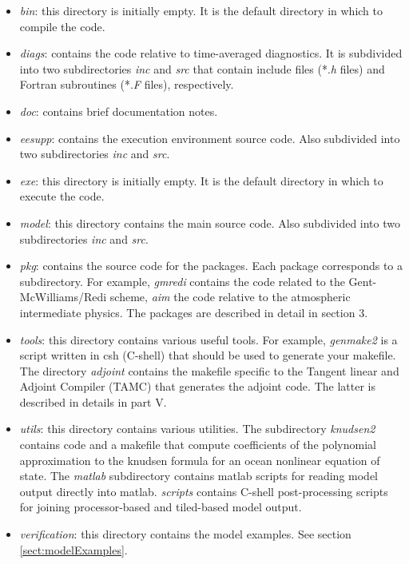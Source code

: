\begin{itemize}
\item \textit{bin}: this directory is initially empty. It is the default
directory in which to compile the code.

\item \textit{diags}: contains the code relative to time-averaged
diagnostics. It is subdivided into two subdirectories \textit{inc} and 
\textit{src} that contain include files (*.\textit{h} files) and Fortran
subroutines (*.\textit{F} files), respectively.

\item \textit{doc}: contains brief documentation notes.

\item \textit{eesupp}: contains the execution environment source code. Also
subdivided into two subdirectories \textit{inc} and \textit{src}.

\item \textit{exe}: this directory is initially empty. It is the default
directory in which to execute the code.

\item \textit{model}: this directory contains the main source code. Also
subdivided into two subdirectories \textit{inc} and \textit{src}.

\item \textit{pkg}: contains the source code for the packages. Each package
corresponds to a subdirectory. For example, \textit{gmredi} contains the
code related to the Gent-McWilliams/Redi scheme, \textit{aim} the code
relative to the atmospheric intermediate physics. The packages are described
in detail in section 3.

\item \textit{tools}: this directory contains various useful tools. For
example, \textit{genmake2} is a script written in csh (C-shell) that should
be used to generate your makefile. The directory \textit{adjoint} contains
the makefile specific to the Tangent linear and Adjoint Compiler (TAMC) that
generates the adjoint code. The latter is described in details in part V.

\item \textit{utils}: this directory contains various utilities. The
subdirectory \textit{knudsen2} contains code and a makefile that
compute coefficients of the polynomial approximation to the knudsen
formula for an ocean nonlinear equation of state. The \textit{matlab}
subdirectory contains matlab scripts for reading model output directly
into matlab. \textit{scripts} contains C-shell post-processing
scripts for joining processor-based and tiled-based model output.

\item \textit{verification}: this directory contains the model examples. See
section \ref{sect:modelExamples}.
\end{itemize}

